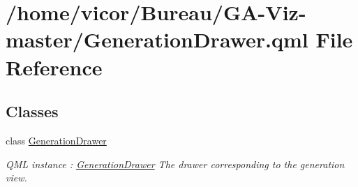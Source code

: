 \hypertarget{_generation_drawer_8qml}{}\section{/home/vicor/\+Bureau/\+G\+A-\/\+Viz-\/master/\+Generation\+Drawer.qml File Reference}
\label{_generation_drawer_8qml}
\subsection*{Classes}
\begin{DoxyCompactItemize}
\item 
class \hyperlink{class_generation_drawer}{Generation\+Drawer}
\begin{DoxyCompactList}\small\item\em Q\+ML instance \+: \hyperlink{class_generation_drawer}{Generation\+Drawer} The drawer corresponding to the generation view. \end{DoxyCompactList}\end{DoxyCompactItemize}
